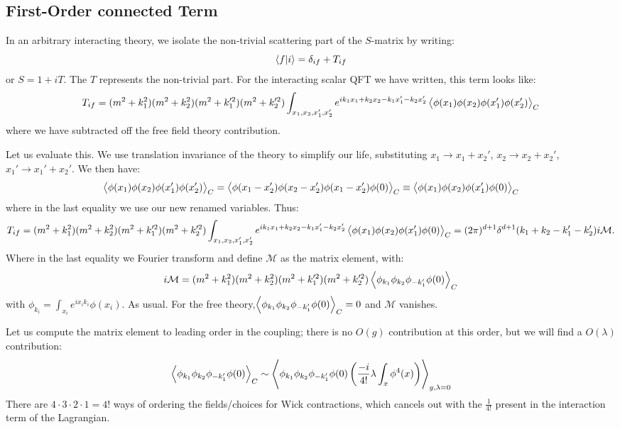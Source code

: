 \subsection{First-Order connected Term}
In an arbitrary interacting theory, we isolate the non-trivial scattering part of the $S$-matrix by writing:
\begin{equation}
    \langle f \lvert i \rangle = \delta_{if} + T_{if}
\end{equation}
or $S = 1 + iT$. The $T$ represents the non-trivial part. For the interacting scalar QFT we have written, this term looks like:
\begin{equation}
    T_{if} = (m^2 + k_1^2)(m^2 + k_2^2)(m^2 + k_1'^2)(m^2 + k_2'^2)\int_{x_1, x_2, x_1', x_2'}e^{ik_1x_1 + k_2x_2 - k_1x_1' - k_2x_2'}\left< \phi(x_1)\phi(x_2)\phi(x_1')\phi(x_2') \right>_C
\end{equation}
where we have subtracted off the free field theory contribution.

Let us evaluate this. We use translation invariance of the theory to simplify our life, substituting $x_1 \to x_1 + x_2'$, $x_2 \to x_2 + x_2'$, $x_1' \to x_1' + x_2'$. We then have:
\begin{equation}
    \left< \phi(x_1)\phi(x_2)\phi(x_1')\phi(x_2') \right>_C = \left< \phi(x_1 - x_2')\phi(x_2-x_2')\phi(x_1-x_2')\phi(0) \right>_C \equiv \left< \phi(x_1)\phi(x_2)\phi(x_1')\phi(0) \right>_C 
\end{equation}
where in the last equality we use our new renamed variables.
Thus:
\begin{equation}
    T_{if} = (m^2 + k_1^2)(m^2 + k_2^2)(m^2 + k_1'^2)(m^2 + k_2'^2)\int_{x_1, x_2, x_1', x_2'}e^{ik_1x_1 + k_2x_2 - k_1x_1' - k_2x_2'}\left< \phi(x_1)\phi(x_2)\phi(x_1')\phi(0) \right>_C = (2\pi)^{d+1}\delta^{d+1}(k_1 + k_2 - k_1' - k_2')i\mathcal{M}.
\end{equation}
Where in the last equality we Fourier transform and define  $\mathcal{M}$ as the matrix element, with:
\begin{equation}
    i\mathcal{M} = (m^2 + k_1^2)(m^2 + k_2^2)(m^2 + k_1'^2)(m^2 + k_2'^2)\left< \phi_{k_1}\phi_{k_2}\phi_{-k_1'}\phi(0) \right>_C
\end{equation}
with $\phi_{k_i} = \int_{x_i}e^{i x_ik_i}\phi(x_i)$. As usual. For the free theory,$\left< \phi_{k_1}\phi_{k_2}\phi_{-k_1'}\phi(0) \right>_C = 0$ and $\mathcal{M}$ vanishes.

Let us compute the matrix element to leading order in the coupling; there is no $O(g)$ contribution at this order, but we will find a $O(\lambda)$ contribution:
\begin{equation}
    \left< \phi_{k_1}\phi_{k_2}\phi_{-k_1'}\phi(0) \right>_C \sim \left< \phi_{k_1}\phi_{k_2}\phi_{-k_1'}\phi(0)\left(\frac{-i}{4!}\lambda \int_x \phi^4(x)\right) \right>_{g,\lambda = 0}
\end{equation}
There are $4 \cdot 3 \cdot 2 \cdot 1 = 4!$ ways of ordering the fields/choices for Wick contractions, which cancels out with the $\frac{1}{4!}$ present in the interaction term of the Lagrangian.

